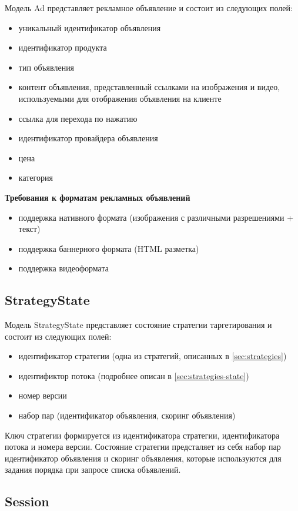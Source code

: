 \documentclass[times]{itmo-student-thesis}
\begin{document}
Модель Ad представляет рекламное объявление и состоит из следующих полей:
\begin{itemize}
\item уникальный идентификатор объявления
\item идентификатор продукта
\item тип объявления 
\item контент объявления, представленный ссылками на изображения и видео, используемыми для отображения объявления на клиенте
\item ссылка для перехода по нажатию
\item идентификатор провайдера объявления
\item цена
\item категория
\end{itemize}

\textbf{Требования к форматам рекламных объявлений}
\begin{itemize}
	\item поддержка нативного формата (изображения с различными разрешениями + текст)
	\item поддержка баннерного формата (HTML разметка)
	\item поддержка видеоформата
\end{itemize}

\subsection{StrategyState}

Модель StrategyState представляет состояние стратегии таргетирования и состоит из следующих полей:
\begin{itemize}
\item идентификатор стратегии (одна из стратегий, описанных в \ref{sec:strategies})
\item идентификтор потока (подробнее описан в \ref{sec:strategies-state})
\item номер версии
\item набор пар (идентификатор объявления, скоринг объявления)
\end{itemize}

Ключ стратегии формируется из идентификатора стратегии, идентификатора потока и номера версии. Состояние стратегии предсталяет из себя набор пар идентификатор объявления и скоринг объявления, которые используются для задания порядка при запросе списка объявлений.

\subsection{Session}
\end{document}
